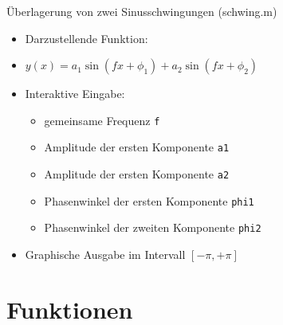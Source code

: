   \secMexercise
  \begin{frame}
      \frameMexercise
      \begin{exercise}
          \sloppy
          Überlagerung von zwei Sinusschwingungen (schwing.m)
          \begin{itemize}
            \item Darzustellende Funktion:
            \item $ y(x) = a_{1}\sin(fx + \phi_{1}) + a_{2}\sin(fx + \phi_{2})$
            \item Interaktive Eingabe:
            \begin{itemize}
              \item gemeinsame Frequenz \texttt{f}
              \item Amplitude der ersten Komponente \texttt{a1}
              \item Amplitude der ersten Komponente \texttt{a2}
              \item Phasenwinkel der ersten Komponente \texttt{phi1}
              \item Phasenwinkel der zweiten Komponente \texttt{phi2}
            \end{itemize}
            \item Graphische Ausgabe im Intervall $[-\pi,+\pi]$
          \end{itemize}
      \end{exercise}
  \end{frame}

  \section{Funktionen}

